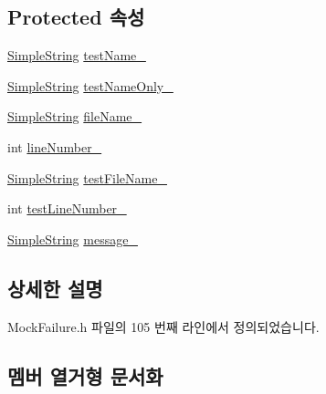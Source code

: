 \subsection*{Protected 속성}
\begin{DoxyCompactItemize}
\item 
\hyperlink{class_simple_string}{Simple\+String} \hyperlink{class_test_failure_afb42d7601608c3597c5279ddaf87e9d6}{test\+Name\+\_\+}
\item 
\hyperlink{class_simple_string}{Simple\+String} \hyperlink{class_test_failure_a60a0b2466b44483497e83d73b70241f2}{test\+Name\+Only\+\_\+}
\item 
\hyperlink{class_simple_string}{Simple\+String} \hyperlink{class_test_failure_a58b6159b0aa3b9775be67920baef742c}{file\+Name\+\_\+}
\item 
int \hyperlink{class_test_failure_ab83f5a7389dae9b8045aa6fbf55b153a}{line\+Number\+\_\+}
\item 
\hyperlink{class_simple_string}{Simple\+String} \hyperlink{class_test_failure_a19c231b59846532ec9d7ac8725886d67}{test\+File\+Name\+\_\+}
\item 
int \hyperlink{class_test_failure_abb1f7af8e12fc84b16898aa5b410ba2a}{test\+Line\+Number\+\_\+}
\item 
\hyperlink{class_simple_string}{Simple\+String} \hyperlink{class_test_failure_af95aeab689fdb637c3e94b0c10db3e53}{message\+\_\+}
\end{DoxyCompactItemize}


\subsection{상세한 설명}


Mock\+Failure.\+h 파일의 105 번째 라인에서 정의되었습니다.



\subsection{멤버 열거형 문서화}
